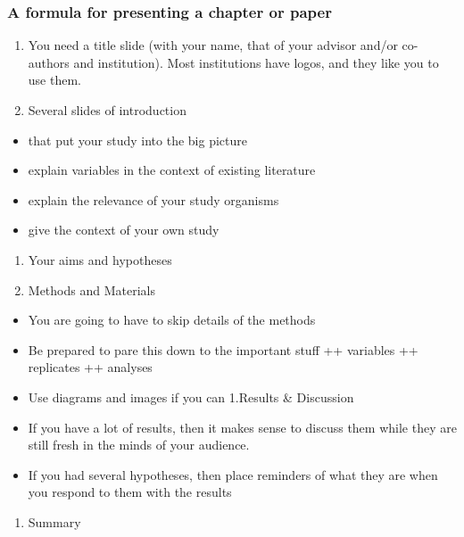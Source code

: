\documentclass[
]{krantz}
\providecommand{\tightlist}{%
  \setlength{\itemsep}{0pt}\setlength{\parskip}{0pt}}
\begin{document}
\hypertarget{a-formula-for-presenting-a-chapter-or-paper}{%
\subsubsection{A formula for presenting a chapter or paper}\label{a-formula-for-presenting-a-chapter-or-paper}}

\begin{enumerate}
\def\labelenumi{\arabic{enumi}.}
\tightlist
\item
  You need a title slide (with your name, that of your advisor and/or co-authors and institution). Most institutions have logos, and they like you to use them.
\item
  Several slides of introduction
\end{enumerate}

\begin{itemize}
\tightlist
\item
  that put your study into the big picture
\item
  explain variables in the context of existing literature
\item
  explain the relevance of your study organisms
\item
  give the context of your own study
\end{itemize}

\begin{enumerate}
\def\labelenumi{\arabic{enumi}.}
\tightlist
\item
  Your aims and hypotheses
\item
  Methods and Materials
\end{enumerate}

\begin{itemize}
\tightlist
\item
  You are going to have to skip details of the methods
\item
  Be prepared to pare this down to the important stuff
  ++ variables
  ++ replicates
  ++ analyses
\item
  Use diagrams and images if you can
  1.Results \& Discussion
\item
  If you have a lot of results, then it makes sense to discuss them while they are still fresh in the minds of your audience.
\item
  If you had several hypotheses, then place reminders of what they are when you respond to them with the results
\end{itemize}

\begin{enumerate}
\def\labelenumi{\arabic{enumi}.}
\tightlist
\item
  Summary
\end{enumerate}
\end{document}
